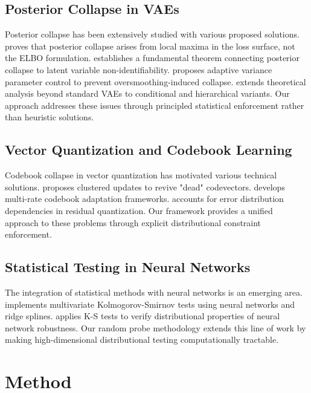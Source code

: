 \documentclass{article}
\begin{document}
\subsection{Posterior Collapse in VAEs}

Posterior collapse has been extensively studied with various proposed solutions. \citet{lucas2019don} proves that posterior collapse arises from local maxima in the loss surface, not the ELBO formulation. \citet{wang2023posterior} establishes a fundamental theorem connecting posterior collapse to latent variable non-identifiability. \citet{takida2022preventing} proposes adaptive variance parameter control to prevent oversmoothing-induced collapse. \citet{dang2024beyond} extends theoretical analysis beyond standard VAEs to conditional and hierarchical variants. Our approach addresses these issues through principled statistical enforcement rather than heuristic solutions.

\subsection{Vector Quantization and Codebook Learning}

Codebook collapse in vector quantization has motivated various technical solutions. \citet{zheng2023online} proposes clustered updates to revive "dead" codevectors. \citet{seo2024rate} develops multi-rate codebook adaptation frameworks. \citet{huijben2024residual} accounts for error distribution dependencies in residual quantization. Our framework provides a unified approach to these problems through explicit distributional constraint enforcement.

\subsection{Statistical Testing in Neural Networks}

The integration of statistical methods with neural networks is an emerging area. \citet{paik2023maximum} implements multivariate Kolmogorov-Smirnov tests using neural networks and ridge splines. \citet{bosman2023robustness} applies K-S tests to verify distributional properties of neural network robustness. Our random probe methodology extends this line of work by making high-dimensional distributional testing computationally tractable.

\section{Method}
\end{document}
